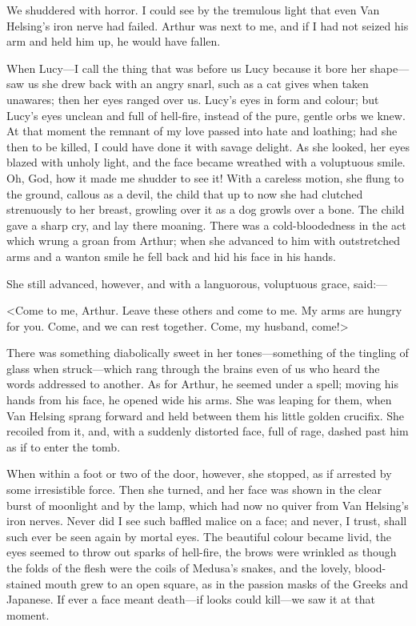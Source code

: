 We shuddered with horror. I could see by the tremulous light that even Van Helsing's iron nerve had failed. Arthur was next to me, and if I had not seized his arm and held him up, he would have fallen.

When Lucy—I call the thing that was before us Lucy because it bore her shape—saw us she drew back with an angry snarl, such as a cat gives when taken unawares; then her eyes ranged over us. Lucy's eyes in form and colour; but Lucy's eyes unclean and full of hell-fire, instead of the pure, gentle orbs we knew. At that moment the remnant of my love passed into hate and loathing; had she then to be killed, I could have done it with savage delight. As she looked, her eyes blazed with unholy light, and the face became wreathed with a voluptuous smile. Oh, God, how it made me shudder to see it! With a careless motion, she flung to the ground, callous as a devil, the child that up to now she had clutched strenuously to her breast, growling over it as a dog growls over a bone. The child gave a sharp cry, and lay there moaning. There was a cold-bloodedness in the act which wrung a groan from Arthur; when she advanced to him with outstretched arms and a wanton smile he fell back and hid his face in his hands.

She still advanced, however, and with a languorous, voluptuous grace, said:—

<Come to me, Arthur. Leave these others and come to me. My arms are hungry for you. Come, and we can rest together. Come, my husband, come!>

There was something diabolically sweet in her tones—something of the tingling of glass when struck—which rang through the brains even of us who heard the words addressed to another. As for Arthur, he seemed under a spell; moving his hands from his face, he opened wide his arms. She was leaping for them, when Van Helsing sprang forward and held between them his little golden crucifix. She recoiled from it, and, with a suddenly distorted face, full of rage, dashed past him as if to enter the tomb.

When within a foot or two of the door, however, she stopped, as if arrested by some irresistible force. Then she turned, and her face was shown in the clear burst of moonlight and by the lamp, which had now no quiver from Van Helsing's iron nerves. Never did I see such baffled malice on a face; and never, I trust, shall such ever be seen again by mortal eyes. The beautiful colour became livid, the eyes seemed to throw out sparks of hell-fire, the brows were wrinkled as though the folds of the flesh were the coils of Medusa's snakes, and the lovely, blood-stained mouth grew to an open square, as in the passion masks of the Greeks and Japanese. If ever a face meant death—if looks could kill—we saw it at that moment.


